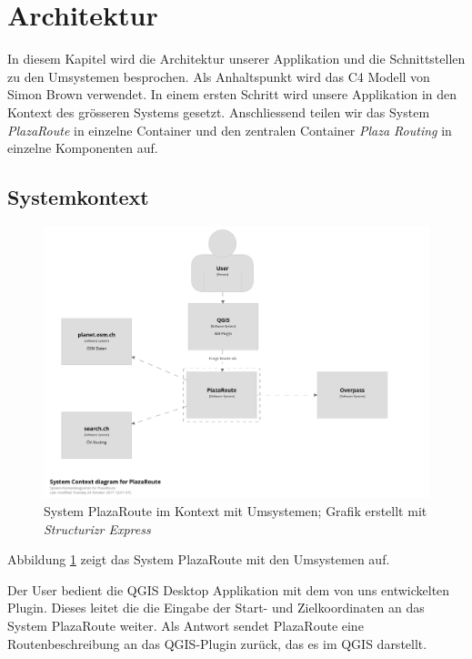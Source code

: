 
\section{Architektur}
\label{sec:Architektur}
In diesem Kapitel wird die Architektur unserer Applikation und die Schnittstellen zu den Umsystemen besprochen. Als Anhaltspunkt wird das C4 Modell \cite{c4model} von Simon Brown verwendet. In einem ersten Schritt wird unsere Applikation in den Kontext des grösseren Systems gesetzt. Anschliessend teilen wir das System \emph{PlazaRoute} in einzelne Container und den zentralen Container \emph{Plaza Routing} in einzelne Komponenten auf.

\subsection{Systemkontext}
\label{architektur:Systemkontext}

\begin{figure}[ht]
\centering
\includegraphics[width=1\linewidth]{projectdoc/img/system-context_diagram.png}
\caption[System Kontext Diagramm]{System PlazaRoute im Kontext mit Umsystemen; Grafik erstellt mit \emph{Structurizr Express}\cite{structurizr}}
\label{fig:system_context_diagram}
\end{figure}

Abbildung \ref{fig:system_context_diagram} zeigt das System PlazaRoute mit den Umsystemen auf.

Der User bedient die QGIS Desktop Applikation mit dem von uns entwickelten Plugin. Dieses leitet die die Eingabe der Start- und Zielkoordinaten an das System PlazaRoute weiter. Als Antwort sendet PlazaRoute eine Routenbeschreibung an das QGIS-Plugin zurück, das es im QGIS darstellt.

